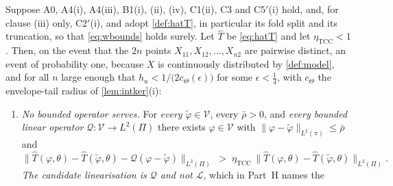 \begin{proposition}\label{prp:tccfails}
Suppose A0, A4(i), A4(iii), B1(i), (ii), (iv), C1(ii), C3 and C5$'$(i) hold, and, for clause (iii)
only, C2$'$(i), and adopt
\cref{def:hatT}, in particular its fold split and its truncation, so that \eqref{eq:wbounds} holds
surely. Let $\hat T$ be \eqref{eq:hatT} and let $\eta_{\mathrm{TCC}}<1$. Then, on the event that the
$2n$ points $X_{11},X_{12},\dots,X_{n2}$ are pairwise distinct, an event of probability one, because
$X$ is continuously distributed by \cref{def:model}, and for all $n$ large enough that
$h_u<1/\big(2c_\Theta(\epsilon)\big)$ for some $\epsilon<\tfrac14$, with $c_\Theta$ the envelope-tail
radius of \cref{lem:intker}(i):
\begin{enumerate}
\item[(i)] \emph{No bounded operator serves.} For \emph{every} $\tilde\varphi\in\mathcal V$, every
$\bar\rho>0$, and \emph{every bounded linear operator} $\mathcal Q:\mathcal V\to L^{2}(\Pi)$ there
exists $\varphi\in\mathcal V$ with $\|\varphi-\tilde\varphi\|_{L^{2}(\pi)}\le\bar\rho$ and
\begin{equation}\label{eq:tccviol}
\big\|\hat T(\varphi,\theta)-\hat T(\tilde\varphi,\theta)-\mathcal Q(\varphi-\tilde\varphi)\big\|_{L^{2}(\Pi)}
\;>\;\eta_{\mathrm{TCC}}\,\big\|\hat T(\varphi,\theta)-\hat T(\tilde\varphi,\theta)\big\|_{L^{2}(\Pi)} .
\end{equation}
\emph{The candidate linearisation is $\mathcal Q$ and not $\mathcal L$}, which in Part~H names the

\end{enumerate}
\end{proposition}

